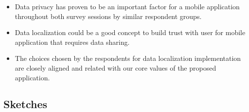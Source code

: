 \begin{enumerate}[a)]
\begin{itemize}
              \begin{itemize}
                \item Data privacy has proven to be an important factor for a mobile application throughout both survey
                sessions by similar respondent groups.
                \item Data localization could be a good concept to build trust with user for mobile application that
                requires data sharing.
                \item The choices chosen by the respondents for data localization implementation are closely aligned
                and related with our core values of the proposed application.
              \end{itemize}
          \end{itemize}
      \end{enumerate}

  \subsection{Sketches}
